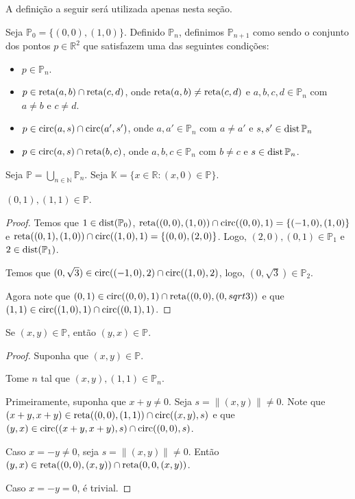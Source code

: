 A definição a seguir será utilizada apenas nesta seção.
\begin{definition}
    Seja $\mathbb{P}_0=\{(0, 0), (1, 0)\}$.
    Definido $\mathbb P_n$, definimos $\mathbb{P}_{n+1}$ como sendo o conjunto dos pontos $p \in \mathbb R^2$ que satisfazem uma das seguintes condições:

    \begin{itemize}
        \item $p \in \mathbb{P}_n$.
        \item $p\in \operatorname{reta}(a, b)\cap \operatorname{reta}(c, d)$, onde $\operatorname{reta}(a, b)\neq \operatorname{reta}(c, d)$ e $a, b, c, d \in \mathbb{P}_n$ com $a\neq b$ e $c\neq d$.
        \item $p\in \operatorname{circ}(a, s)\cap \operatorname{circ}(a', s')$, onde $a, a'\in \mathbb{P}_n$ com $a\neq a'$ e $s, s' \in \operatorname{dist} \mathbb P_n$
        \item $p\in \operatorname{circ}(a, s)\cap \operatorname{reta}(b, c)$, onde $a, b, c \in \mathbb{P}_n$ com $b\neq c$ e $s \in \operatorname{dist} \mathbb P_n$.
    \end{itemize}

    Seja $\mathbb P=\bigcup_{n\in \mathbb N} \mathbb P_n$.
    Seja $\mathbb K=\{x \in \mathbb R: (x, 0) \in \mathbb P\}$.
\end{definition}

\begin{lemma}
   $(0, 1), (1, 1) \in \mathbb P$.
\end{lemma}
\begin{proof}
    Temos que $1 \in \operatorname{dist}(\mathbb P_0)$, $\operatorname{reta}((0, 0), (1, 0))\cap \operatorname{circ}((0, 0), 1)=\{(-1, 0), (1, 0)\}$ e $\operatorname{reta}((0, 1), (1, 0))\cap \operatorname{circ}((1, 0), 1)=\{(0, 0), (2, 0)\}$. Logo, $(2, 0), (0, 1)\in \mathbb P_1$ e $2 \in \operatorname{dist}(\mathbb P_1)$.

    Temos que $(0, \sqrt 3) \in \operatorname{circ}((-1, 0), 2)\cap \operatorname{circ}((1, 0), 2)$, logo, $(0, \sqrt 3) \in  \mathbb P_2$.

    Agora note que $(0, 1) \in \operatorname{circ}((0, 0), 1)\cap \operatorname{reta}((0, 0), (0, sqrt 3))$ e que $(1, 1)\in \operatorname{circ}((1, 0), 1)\cap \operatorname{circ}((0, 1), 1)$.
\end{proof}

\begin{lemma}
   Se $(x, y) \in \mathbb P$, então $(y, x) \in \mathbb P$.
\end{lemma}
\begin{proof}
    Suponha que $(x, y) \in \mathbb P$.
    
    Tome $n$ tal que $(x, y), (1, 1) \in \mathbb P_n$.

    Primeiramente, suponha que $x+y\neq 0$. Seja $s=\|(x, y)\|\neq 0$. Note que $(x+y, x+y)\in \operatorname{reta}((0, 0), (1, 1))\cap \operatorname{circ}((x, y), s)$ e que $(y, x) \in \operatorname{circ}((x+y, x+y), s)\cap \operatorname{circ}((0, 0), s)$.

    Caso $x=-y\neq 0$, seja $s=\|(x, y)\|\neq 0$. Então $(y, x)\in \operatorname{reta}((0, 0), (x, y))\cap \operatorname{reta}(0, 0, (x, y))$.

    Caso $x=-y=0$, é trivial.
\end{proof}

